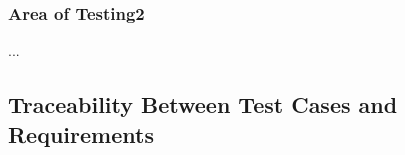 \documentclass[12pt, titlepage]{article}
\begin{document}
\subsubsection{Area of Testing2}

...

\subsection{Traceability Between Test Cases and Requirements}


		



					
					
					
					
					

					
					
					
					


\end{document}
